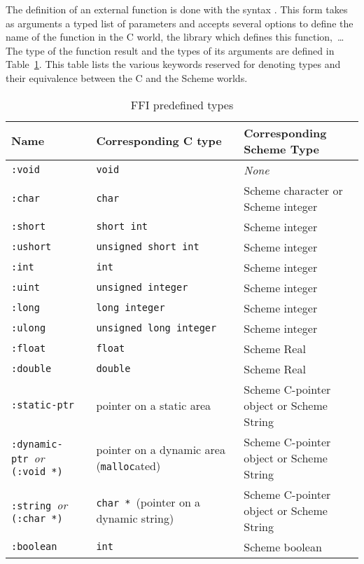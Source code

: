 The definition of an external function is done with the syntax
.  This form takes as arguments a typed list of
parameters and accepts several options to define the name of the
function in the C world, the library which defines this
function,~\ldots{} The type of the function result and the types of
its arguments are defined in Table~\ref{FfiTypes}. This table lists the various
keywords reserved for denoting types and their equivalence between the
C and the Scheme worlds.

\begin{table}[t]
  \begin{center}

   \begin{tabular}{|p{3cm}|p{5cm}|p{5cm}|}
\hline 
\textbf{Name}&\textbf{Corresponding C type}&\textbf{Corresponding Scheme Type }\\
\hline 
\hline 
\texttt{:void}&\texttt{void}&\emph{None}\\
\hline 

\texttt{:char}&\texttt{char}&Scheme character or Scheme integer\\
\hline 

\texttt{:short}&\texttt{short~int}&Scheme integer\\
\hline 

\texttt{:ushort}&\texttt{unsigned~short~int}&Scheme integer\\
\hline 

\texttt{:int}&\texttt{int}&Scheme integer\\
\hline 

\texttt{:uint}&\texttt{unsigned~integer}&Scheme integer\\
\hline 

\texttt{:long}&\texttt{long~integer}&Scheme integer\\
\hline 

\texttt{:ulong}&\texttt{unsigned~long~integer}&Scheme integer\\
\hline 

\texttt{:float}&\texttt{float}&Scheme Real\\
\hline 

\texttt{:double}&\texttt{double}&Scheme Real\\
\hline 

\texttt{:static-ptr}&pointer on a static area&Scheme C-pointer object or Scheme String\\
\hline 

\texttt{:dynamic-ptr}~\emph{or} \texttt{(:void~{*})}&pointer on a dynamic area (\texttt{malloc}ated) &
Scheme C-pointer object or Scheme String\\
\hline  

\texttt{:string}~\emph{or} \texttt{(:char~{*})}&\texttt{char~{*}}~(pointer on a dynamic string)&Scheme C-pointer object or Scheme String\\
\hline 

\texttt{:boolean}&\texttt{int}&Scheme boolean\\
\hline 
\end{tabular} 
\caption{FFI predefined types}
\label{FfiTypes}
  \end{center}
\end{table}


